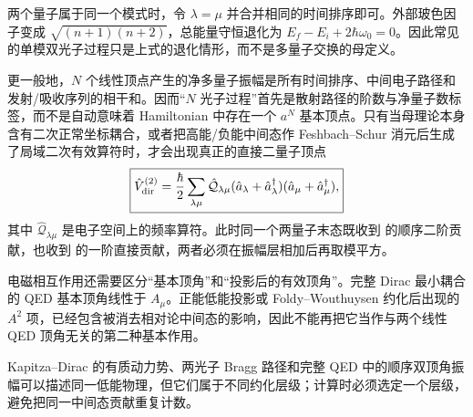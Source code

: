 两个量子属于同一个模式时，令 $\lambda=\mu$ 并合并相同的时间排序即可。外部玻色因子变成
$\sqrt{(n+1)(n+2)}$，总能量守恒退化为
$E_f-E_i+2\hbar\omega_0=0$。因此常见的单模双光子过程只是上式的退化情形，而不是多量子交换的母定义。

更一般地，$N$ 个线性顶点产生的净多量子振幅是所有时间排序、中间电子路径和发射/吸收序列的相干和。因而“$N$ 光子过程”首先是散射路径的阶数与净量子数标签，而不是自动意味着 Hamiltonian 中存在一个 $a^N$ 基本顶点。只有当母理论本身含有二次正常坐标耦合，或者把高能/负能中间态作 Feshbach--Schur 消元后生成了局域二次有效算符时，才会出现真正的直接二量子顶点
\begin{equation}
\boxed{
\hat V_{\rm dir}^{(2)}
=\frac{\hbar}{2}
\sum_{\lambda\mu}
\hat{\mathcal Q}_{\lambda\mu}
(\hat a_\lambda+\hat a_\lambda^\dagger)
(\hat a_\mu+\hat a_\mu^\dagger),}
\label{eq:general_direct_quadratic_boson_vertex}
\end{equation}
其中 $\hat{\mathcal Q}_{\lambda\mu}$ 是电子空间上的频率算符。此时同一个两量子末态既收到 的顺序二阶贡献，也收到 的一阶直接贡献，两者必须在振幅层相加后再取模平方。

电磁相互作用还需要区分“基本顶角”和“投影后的有效顶角”。完整 Dirac 最小耦合的 QED 基本顶角线性于 $A_\mu$。正能低能投影或 Foldy--Wouthuysen 约化后出现的 $A^2$ 项，已经包含被消去相对论中间态的影响，因此不能再把它当作与两个线性 QED 顶角无关的第二种基本作用。

Kapitza--Dirac 的有质动力势、两光子 Bragg 路径和完整 QED 中的顺序双顶角振幅可以描述同一低能物理，但它们属于不同约化层级；计算时必须选定一个层级，避免把同一中间态贡献重复计数。


